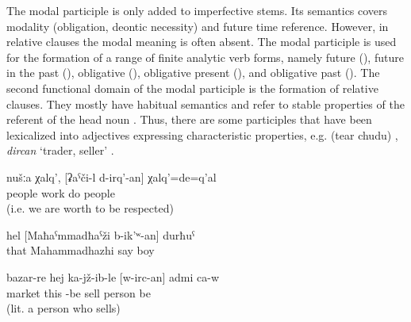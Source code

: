 The modal participle  is only added to imperfective stems. Its semantics covers modality (obligation, deontic necessity) and future time reference. However, in relative clauses the modal meaning is often absent. The modal participle is used for the formation of a range of finite analytic verb forms, namely future (), future in the past (), obligative (), obligative present (), and obligative past (). The second functional domain of the modal participle is the formation of relative clauses. They mostly have habitual semantics and refer to stable properties of the referent of the head noun . Thus, there are some participles that have been lexicalized into adjectives expressing characteristic properties, e.g.  (tear  chudu) , \textit{dircan} `trader, seller' .
	\begin{exe}
		\ex	\label{ex:We are people who were working}
		\gll	nušːa	χalq',	[ʡaˁči-l	d-irq'-an]	χalq'=de=q'al\\
				people	work	do	people\\
		\glt	{} (i.e. we are worth to be respected)

		\ex	\label{ex:the boy called MahammadhazhiVerbs}
		\gll	hel	[Maħaˁmmadħaˁži	b-ik'ʷ-an]	durħuˁ\\
			that	Mahammadhazhi	say	boy	\\
		\glt	{}

		\ex	\label{ex:on the market seated is a trader (a person who sells)}
		\gll	bazar-re	hej	ka-jž-ib-le	[w-irc-an]	admi	ca-w\\
			market	this	-be	sell	person	be\\
		\glt	{} (lit. a person who sells)
	\end{exe}

